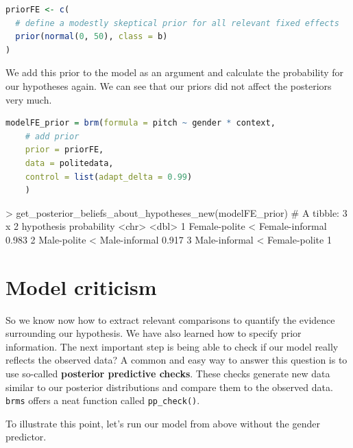 \documentclass[nobib]{tufte-handout}
\begin{document}
\bigskip

\begin{minipage}[]{1\textwidth}
\begin{lstlisting}[language=R]
priorFE <- c(
  # define a modestly skeptical prior for all relevant fixed effects
  prior(normal(0, 50), class = b)
)
\end{lstlisting}
\end{minipage}

We add this prior to the model as an argument and calculate the probability for our hypotheses again. We can see that our priors did not affect the posteriors very much.

\bigskip

\begin{minipage}[]{1\textwidth}
\begin{lstlisting}[language=R]
modelFE_prior = brm(formula = pitch ~ gender * context,
	# add prior 
	prior = priorFE,
	data = politedata,
	control = list(adapt_delta = 0.99)
	)    
\end{lstlisting}
\end{minipage}

\begin{minipage}[]{\textwidth}
\begin{rc}
> get_posterior_beliefs_about_hypotheses_new(modelFE_prior)
# A tibble: 3 x 2
  hypothesis                      probability
  <chr>                                 <dbl>
1 Female-polite < Female-informal       0.983
2 Male-polite < Male-informal           0.917
3 Male-informal < Female-polite         1  
\end{rc}
\end{minipage}

\section{Model criticism}

So we know now how to extract relevant comparisons to quantify the evidence surrounding our hypothesis. We have also learned how to specify prior information. The next important step is being able to check if our model really reflects the observed data? A common and easy way to answer this question is to use so-called \textbf{posterior predictive checks}. These checks generate new data similar to our posterior distributions and compare them to the observed data. \texttt{brms} offers a neat function called \texttt{pp\_check()}. 

To illustrate this point, let's run our model from above without the gender predictor. 
\end{document}

